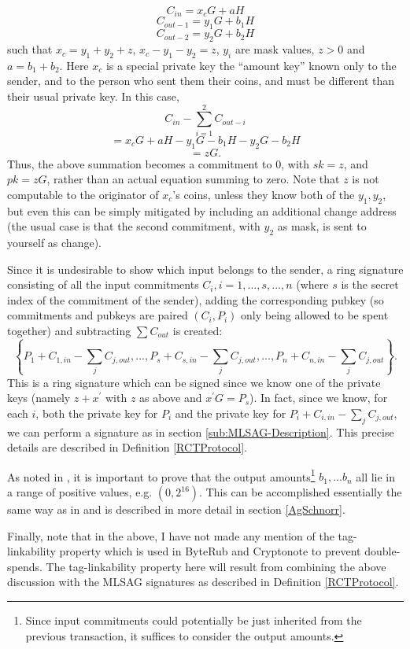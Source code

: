 \documentclass[12pt,english]{mrl}
\theoremstyle{definition}
\numberwithin{equation}{section}
\numberwithin{figure}{section}
\numberwithin{equation}{section}
\numberwithin{equation}{section}
\numberwithin{figure}{section}
\begin{document}
\[
C_{in}=x_{c}G+aH
\]
\[
C_{out-1}=y_{1}G+b_{1}H
\]
\[
C_{out-2}=y_{2}G+b_{2}H
\]
 such that $x_{c}=y_{1}+y_{2}+z$, $x_{c}-y_{1}-y_{2}=z$, $y_{i}$
are mask values, $z>0$ and $a=b_{1}+b_{2}.$ Here $x_{c}$ is a special
private key the ``amount key'' known only to the sender, and to
the person who sent them their coins, and must be different than their
usual private key. In this case, 
\[
C_{in}-\sum_{i=1}^{2}C_{out-i}
\]
\[
=x_{c}G+aH-y_{1}G-b_{1}H-y_{2}G-b_{2}H
\]
\[
=zG.
\]
Thus, the above summation becomes a commitment to $0$, with $sk=z$,
and $pk=zG$, rather than an actual equation summing to zero. Note
that $z$ is not computable to the originator of $x_{c}$'s coins,
unless they know both of the $y_{1},y_{2}$, but even this can be simply mitigated by including an additional change address (the usual case is that the second commitment, with $y_2$ as mask, is sent to yourself as change).  

Since it is undesirable to show which input belongs to the sender,
a ring signature consisting of all the input commitments $C_{i},i=1,...,s,...,n$
(where $s$ is the secret index of the commitment of the sender),
adding the corresponding pubkey (so commitments and pubkeys are paired
$\left(C_{i},P_{i}\right)$ only being allowed to be spent together)
and subtracting $\sum C_{out}$ is created: 
\[
\left\{ P_{1}+C_{1,in}-\sum_{j}C_{j,out},...,P_{s}+C_{s,in}-\sum_{j}C_{j,out},...,P_{n}+C_{n,in}-\sum_{j}C_{j,out}\right\} .
\]
 This is a ring signature which can be signed since we know one of
the private keys (namely $z+x^{\prime}$ with $z$ 
as above and $x^{\prime}G=P_{s}$). In fact, since we know, for each $i$, both the private key for $P_{i}$ and the private key for $P_{i}+C_{i,in}-\sum_{j}C_{j,out}$,
we can perform a signature as in section \ref{sub:MLSAG-Description}. This precise details are described in Definition \ref{RCTProtocol}.

As noted in \cite{GM}, it is important to prove that the output amounts\footnote{Since input commitments could potentially be just inherited from the
previous transaction, it suffices to consider the output amounts.}
$b_{1},...b_{n}$ all lie in a range of positive values, e.g. $(0,2^{16}).$
This can be accomplished essentially the same way as in \cite{GM} and is described in more detail in section \ref{AgSchnorr}.

Finally, note that in the above, I have not made any mention of the tag-linkability property which is used in ByteRub and Cryptonote to prevent double-spends. The tag-linkability property here will result from combining the above discussion with the MLSAG signatures as described in Definition \ref{RCTProtocol}.
\end{document}
